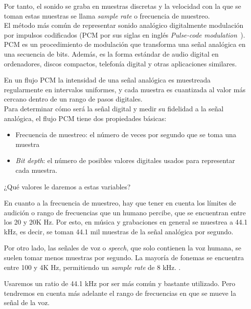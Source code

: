 Por tanto, el sonido se graba en muestras discretas y la velocidad con la que se toman estas muestras se llama \emph{sample rate} o frecuencia de muestreo. \\

El método más común de representar sonido analógico digitalmente modulación por impulsos codificados (PCM por sus siglas en inglés \emph{Pulse-code modulation}~\cite{REF}). %
PCM es un procedimiento de modulación que transforma una señal analógica en una secuencia de bits. Además, es la forma estándar de audio digital en ordenadores, discos compactos, telefonía digital y otras aplicaciones similares. \cite{REF}%
 
 En un flujo PCM la intensidad de una señal analógica es muestreada regularmente en intervalos uniformes, y cada muestra es cuantizada al valor más cercano dentro de un rango de pasos digitales. \\

Para determinar cómo será la señal digital y medir su fidelidad a la señal analógica, el flujo PCM tiene dos propiedades básicas:
\begin{itemize}
\item Frecuencia de muestreo: el número de veces por segundo que se toma una muestra
\item \emph{Bit depth}: el número de posibles valores digitales usados para representar cada muestra. 
\end{itemize}

¿Qué valores le daremos a estas variables?

En cuanto a la frecuencia de muestreo, hay que tener en cuenta los límites de audición o rango de frecuencias que un humano percibe, que se encuentran entre los 20 y 20K Hz. Por esto, en música y grabaciones en general se muestrea a 44.1 kHz, es decir, se toman 44.1 mil muestras de la señal analógica por segundo.

Por otro lado, las señales de voz o \emph{speech}, que solo contienen la voz humana, se suelen tomar menos muestras por segundo. La mayoría de fonemas se encuentra entre 100 y 4K Hz, permitiendo un \emph{sample rate} de 8 kHz.  \cite{REF}.%

Usaremos un ratio de 44.1 kHz por ser más común y bastante utilizado. Pero tendremos en cuenta más adelante el rango de frecuencias en que se mueve la señal de la voz. \\

